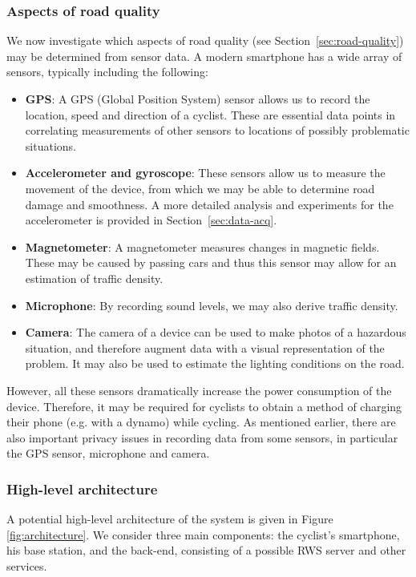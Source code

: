 \documentclass[a4paper,11pt]{article}
\begin{document}
\subsubsection{Aspects of road quality}

We now investigate which aspects of road quality (see Section~\ref{sec:road-quality}) 
may be determined from sensor data. A modern 
smartphone has a wide array of sensors, typically including the following:
\begin{itemize}\setlength{\itemsep}{-3pt}
\item \textbf{GPS}: A GPS (Global Position System) sensor allows us 
to record the location, speed and direction of a cyclist. 
These are essential data points in correlating measurements of other sensors to 
locations of possibly problematic situations.
\item \textbf{Accelerometer and gyroscope}: 
These sensors allow us to measure the movement of the device, from which 
we may be able to determine road damage and smoothness. 
A more detailed analysis and experiments for the accelerometer is provided in Section~\ref{sec:data-acq}.
\item \textbf{Magnetometer}: A magnetometer measures changes in magnetic fields. 
These may be caused by passing cars and thus this sensor may allow for an estimation of traffic density.
\item \textbf{Microphone}: By recording sound levels, we may also derive traffic density.
\item \textbf{Camera}: The camera of a device can be used to make photos of a hazardous situation, 
and therefore augment data with a visual representation of the problem. 
It may also be used to estimate the lighting conditions on the road.
\end{itemize}
However, all these sensors dramatically increase the power consumption of the device. 
Therefore, it may be required for cyclists to obtain a method of charging their phone 
(e.g. with a dynamo) while cycling. As mentioned earlier, there are also important 
privacy issues in recording data from some sensors, in particular the GPS sensor, microphone and camera.

\subsubsection{High-level architecture}
A potential high-level architecture of the system is given in Figure \ref{fig:architecture}. 
We consider three main components: the cyclist's smartphone, his base station, and the back-end, consisting of 
a possible RWS server and other services.
\end{document}
